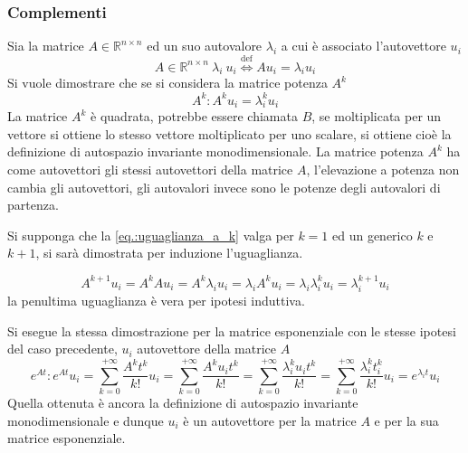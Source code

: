 \subsubsection{Complementi}
Sia la matrice $A\in\mathbb{R}^{n\times n}$ ed un suo autovalore $\lambda_i$ a
cui è associato l'autovettore $u_i$
$$
A\in\mathbb{R}^{n\times n}\ \lambda_i\ u_i
\stackrel{\text{def}}{\Leftrightarrow} Au_i = \lambda_iu_i
$$
Si vuole dimostrare che se si considera la matrice potenza $A^k$
\begin{equation}
A^k : A^ku_i = \lambda_i^ku_i
\label{eq.:uguaglianza_a_k}
\end{equation}
La matrice $A^k$ è quadrata, potrebbe essere chiamata $B$, se moltiplicata per
un vettore si ottiene lo stesso vettore moltiplicato per uno scalare, si
ottiene cioè la definizione di autospazio invariante monodimensionale.
La matrice potenza $A^k$ ha come autovettori gli stessi autovettori della
matrice $A$, l'elevazione a potenza non cambia gli autovettori, gli autovalori
invece sono le potenze degli autovalori di partenza.

Si supponga che la \ref{eq.:uguaglianza_a_k} valga per $k=1$ ed un generico $k$
e $k+1$, si sarà dimostrata per induzione l'uguaglianza.

$$
A^{k+1}u_i = A^k A u_i = A^k \lambda_i u_i = \lambda_i A^k u_i = \lambda_i
\lambda_i^k u_i = \lambda_i^{k+1} u_i
$$
la penultima uguaglianza è vera per ipotesi induttiva.

Si esegue la stessa dimostrazione per la matrice esponenziale con le stesse
ipotesi del caso precedente, $u_i$ autovettore della matrice $A$
$$
e^{At} : e^{At}u_i = \sum_{k=0}^{+\infty} \frac{A^k t^k} {k!}u_i =
\sum_{k=0}^{+\infty} \frac{A^k u_i t^k}{k!} = \sum_{k=0}^{+\infty}
\frac{\lambda_i^ku_it^k}{k!} = \sum_{k=0}^{+\infty} \frac{\lambda_i^k
t_i^k}{k!}u_i = e^{\lambda_i t}u_i
$$
Quella ottenuta è ancora la definizione di autospazio invariante
monodimensionale e dunque $u_i$ è un autovettore per la matrice $A$ e per la
sua matrice esponenziale.
